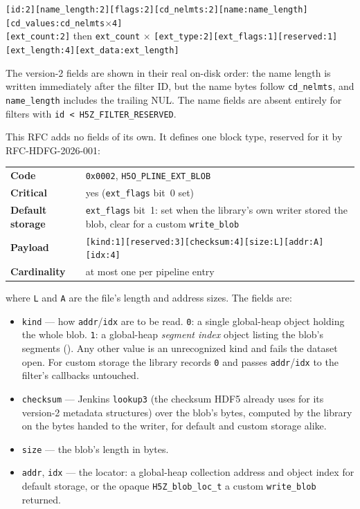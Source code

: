 \documentclass[../RFC-HDFG-2026-003.tex]{subfiles}
\begin{document}
\begin{center}
\texttt{[id:2][name\_length:2][flags:2][cd\_nelmts:2][name:name\_length][cd\_values:cd\_nelmts$\times$4]}\\
\texttt{[ext\_count:2]} then \texttt{ext\_count} $\times$
\texttt{[ext\_type:2][ext\_flags:1][reserved:1][ext\_length:4][ext\_data:ext\_length]}
\end{center}

\noindent The version-2 fields are shown in their real on-disk order: the
name length is written immediately after the filter ID, but the name bytes
follow \texttt{cd\_nelmts}, and \texttt{name\_length} includes the
trailing NUL.  The name fields are absent entirely for filters with
\texttt{id~<~H5Z\_FILTER\_RESERVED}.

This RFC adds no fields of its own.  It defines one block type, reserved
for it by RFC-HDFG-2026-001:

\begin{center}
\begin{tabular}{ll}
\toprule
\textbf{Code} & \texttt{0x0002}, \texttt{H5O\_PLINE\_EXT\_BLOB} \\
\textbf{Critical} & yes (\texttt{ext\_flags} bit~0 set) \\
\textbf{Default storage} & \texttt{ext\_flags} bit~1: set when the
  library's own writer stored the blob, clear for a custom
  \texttt{write\_blob} \\
\textbf{Payload} & \texttt{[kind:1][reserved:3][checksum:4][size:L][addr:A][idx:4]} \\
\textbf{Cardinality} & at most one per pipeline entry \\
\bottomrule
\end{tabular}
\end{center}

\noindent where \texttt{L} and \texttt{A} are the file's length and address
sizes.  The fields are:

\begin{itemize}
\item \texttt{kind} --- how \texttt{addr}/\texttt{idx} are to be read.
  \texttt{0}: a single global-heap object holding the whole blob.
  \texttt{1}: a global-heap \emph{segment index} object listing the
  blob's segments ().  Any other
  value is an unrecognized kind and fails the dataset open.  For custom
  storage the library records \texttt{0} and passes \texttt{addr}/\texttt{idx}
  to the filter's callbacks untouched.
\item \texttt{checksum} --- Jenkins \texttt{lookup3} (the checksum HDF5
  already uses for its version-2 metadata structures) over the blob's
  bytes, computed by the library on the bytes handed to the writer, for
  default and custom storage alike.
\item \texttt{size} --- the blob's length in bytes.
\item \texttt{addr}, \texttt{idx} --- the locator: a global-heap
  collection address and object index for default storage, or the
  opaque \texttt{H5Z\_blob\_loc\_t} a custom \texttt{write\_blob} returned.
\end{itemize}
\end{document}
